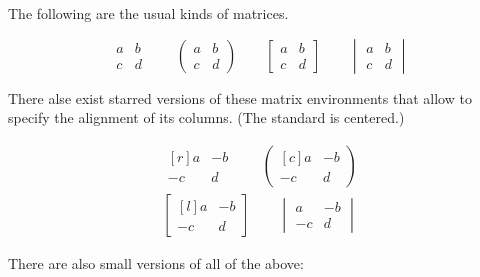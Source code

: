 \documentclass[a4paper, 10pt, abstract=on, headings=standardclasses]{scrartcl}
\begin{document}
The following are the usual kinds of matrices.
\begin{LTXexample}[pos = r]
  \[
    \begin{matrix}
      a & b \\
      c & d
    \end{matrix}
    \qquad
    \begin{pmatrix}
      a & b \\
      c & d
    \end{pmatrix}
    \qquad
    \begin{bmatrix}
      a & b \\
      c & d
    \end{bmatrix}
    \qquad
    \begin{vmatrix}
      a & b \\
      c & d
    \end{vmatrix}
  \]
\end{LTXexample}
There alse exist starred versions of these matrix environments that allow to specify the alignment of its columns.
(The standard is centered.)
\begin{LTXexample}[pos = r]
  \begin{gather*}
    \begin{matrix*}[r]
       a & -b \\
      -c &  d
    \end{matrix*}
    \qquad
    \begin{pmatrix*}[c]
       a & -b \\
      -c &  d
    \end{pmatrix*}
  \\
    \begin{bmatrix*}[l]
       a & -b \\
      -c &  d
    \end{bmatrix*}
    \qquad
    \begin{vmatrix}
       a & -b \\
      -c &  d
    \end{vmatrix}
  \end{gather*}
\end{LTXexample}
There are also small versions of all of the above:
\end{document}
